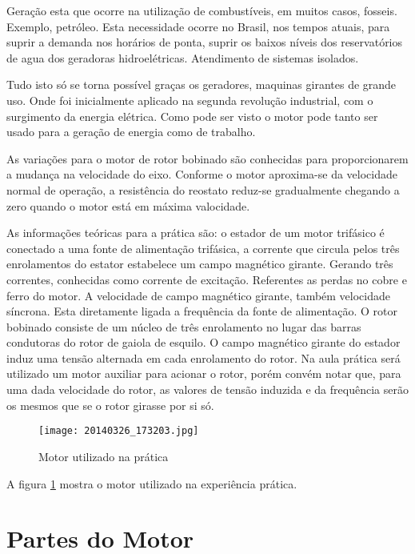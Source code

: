 \documentclass[paper=a4, fontsize=11pt]{article}
\begin{document}
Geração esta que ocorre na utilização de combustíveis, 
em muitos casos, fosseis. Exemplo, petróleo. Esta 
necessidade ocorre no Brasil, nos tempos atuais, para
suprir a demanda nos horários de ponta, suprir
os baixos níveis dos reservatórios de agua dos 
geradoras hidroelétricas. Atendimento de sistemas
isolados. 

Tudo isto só se torna possível graças os geradores, 
maquinas girantes de grande uso. Onde foi inicialmente 
aplicado na segunda revolução industrial, com o surgimento
da energia elétrica. Como pode ser visto o motor
pode tanto ser usado para a geração de energia como de 
trabalho.

As variações para o motor de rotor bobinado são conhecidas
para proporcionarem a mudança na velocidade do eixo. Conforme
o motor aproxima-se da velocidade normal de operação, a 
resistência do reostato reduz-se gradualmente chegando a 
zero quando o motor está em máxima valocidade.

As informações teóricas para a prática são: o estador 
de um motor trifásico é conectado a uma fonte de alimentação
trifásica, a corrente que circula pelos três enrolamentos 
do estator estabelece um campo magnético girante. Gerando
três correntes, conhecidas como corrente de excitação. 
Referentes as perdas no cobre e ferro do motor. A velocidade
de campo magnético girante, também velocidade síncrona. Esta
diretamente ligada a frequência da fonte de alimentação. 
O rotor bobinado consiste de um núcleo de três enrolamento no
lugar das barras condutoras do rotor de gaiola de esquilo. O
campo magnético girante do estador induz uma tensão alternada
em cada enrolamento do rotor. Na aula prática será utilizado
um motor auxiliar para acionar o rotor, porém convém notar que, 
para uma dada velocidade do rotor, as valores de tensão 
induzida e da frequência serão os mesmos que se o rotor 
girasse por si só.

\begin{figure}[!ht]
    \centering
    \texttt{[image: 20140326\_173203.jpg]}
    \caption{Motor utilizado na prática}
    \label{fig:motorutilizado}
\end{figure}

A figura \ref{fig:motorutilizado} mostra o motor utilizado
na experiência prática.

\section{Partes do Motor}
\end{document}
